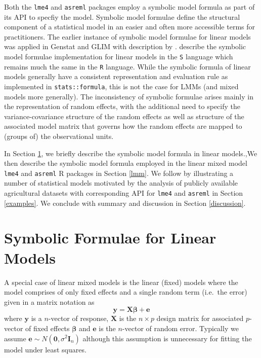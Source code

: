 \documentclass[runningheads]{llncs}
\begin{document}
Both the \texttt{lme4} and \texttt{asreml} packages employ a symbolic model formula as part of its API to specfiy the model. Symbolic model formulae define the structural component of a statistical model in an easier and often more accessible terms for practitioners. The earlier instance of symbolic model formulae for linear models was applied in Genstat \autocite{genstat} and GLIM \autocite{GLIM} with description by \textcite{Wilkinson1973}. \textcite{Chambers1993} describe the symbolic model formulae implementation for linear models in the \texttt{S} language which remains much the same in the \texttt{R} language. While the symbolic formula of linear models generally have a consistent representation and evaluation rule as implemented in \texttt{stats::formula}, this is not the case for LMMs (and mixed models more generally). The inconsistency of symbolic formulae arises mainly in the representation of random effects, with the additional need to specify the variance-covariance structure of the random effects as well as structure of the associated model matrix that governs how the random effects are mapped to (groups of) the observational units.

In Section \ref{lm}, we briefly describe the symbolic model formula in linear models.,We then describe the symbolic model formula employed in the linear mixed model \texttt{lme4} and \texttt{asreml} R packages in Section \ref{lmm}. We follow by illustrating a number of statistical models motivated by the analysis of publicly available agricultural datasets with corresponding API for \texttt{lme4} and \texttt{asreml} in Section \ref{examples}. We conclude with summary and discussion in Section \ref{discussion}.

\hypertarget{lm}{%
\section{Symbolic Formulae for Linear Models}\label{lm}}

A special case of linear mixed models is the linear (fixed) models where the model comprises of only fixed effects and a single random term (i.e.~the error) given in a matrix notation as
\begin{equation}
\boldsymbol{y} = \mathbf{X}\boldsymbol{\beta} + \boldsymbol{e}\label{eq:lm}
\end{equation}
where \(\boldsymbol{y}\) is a \(n\)-vector of response, \(\mathbf{X}\) is the \(n\times p\) design matrix for associated \(p\)-vector of fixed effects \(\boldsymbol{\beta}\) and \(\boldsymbol{e}\) is the \(n\)-vector of random error. Typically we assume \(\boldsymbol{e} \sim N(\boldsymbol{0}, \sigma^2\mathbf{I}_n)\) although this assumption is unnecessary for fitting the model under least squares.
\end{document}
